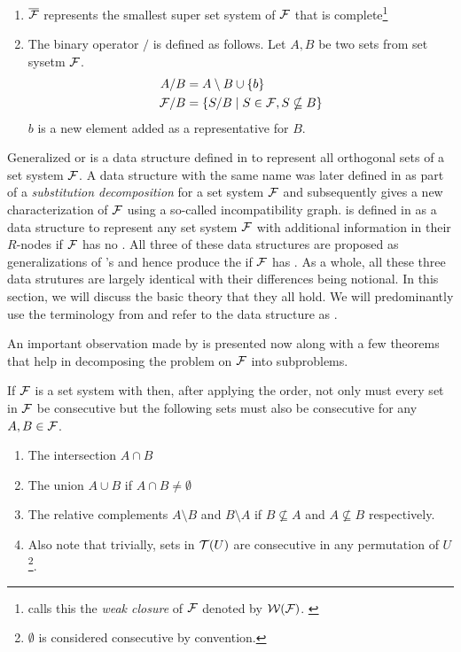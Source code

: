 \begin{definition}
\begin{enumerate}
  \item $\overline{{\cal F}}$ represents the smallest super set system of
    ${\cal F}$ that is complete\footnote{\cite[Def.~3.2]{mcc04} calls
      this the {\em weak closure} of ${\cal F}$ denoted by
      ${\cal W}({\cal F})$. \label{mcc3}}

  \item \label{def::slashop} The binary operator $/$ is defined as
    follows. Let $A, B$ be two sets from set sysetm ${\cal F}$.
    \begin{align*}
      A/B &= A \setminus B \cup \{b\}\\
      {\cal F}/B &= \{ S/B \mid S \in {\cal F}, S \nsubseteq B \}
    \end{align*}
    $b$ is a new element added as a representative for $B$.
 \end{enumerate}
  \dstop
\end{definition}

Generalized \PQtree or \gPQtree is a data structure defined in
\cite{n89} to represent all orthogonal sets of a set system ${\cal F}$. A
data structure with the same name was later defined in \cite{mcc04} as
part of a {\em substitution decomposition} for a set system ${\cal F}$
 and subsequently \cite{mcc04} gives
a new characterization of ${\cal F}$ using a so-called incompatibility
graph. \PQRtree is defined in \cite{mm96} as a data
structure to represent any set system ${\cal F}$ with additional
information in their $R$-nodes if ${\cal F}$ has no \COP.  All three of
these data structures are proposed as generalizations of \cite{bl76}'s
\PQtree and hence produce the \PQtree if ${\cal F}$ has \COP. As a whole,
all these three data strutures are largely identical with their
differences being notional.  In this section, we will discuss the
basic theory that they all hold. We will predominantly use the
terminology from \cite{mm96} and refer to the data structure as
\PQRtree.

An important observation made by \cite{mm96} is presented now along
with a few theorems that help in decomposing the \COP problem on ${\cal F}$
into subproblems.

\begin{observation}[{\cite[Sec.~3]{mm96}}]
  If ${\cal F}$ is a set system with \COP then, after applying the \COP
  order, not only must every set in ${\cal F}$ be consecutive but the
  following sets must also be consecutive for any $A, B \in {\cal F}$.
\begin{enumerate}
  \item The intersection $A \cap B$ 
  \item The union $A \cup B$ if $A \cap B \ne \emptyset$
  \item The relative complements $A \setminus B$ and $B \setminus A$
    if $B \nsubseteq A$ and $A \nsubseteq B$ respectively.
  \item Also note that trivially, sets in ${\cal T}(U)$ are consecutive in
    any permutation of $U$\footnote{$\emptyset$ is considered
      consecutive by convention.}.
\end{enumerate}
\end{observation}

